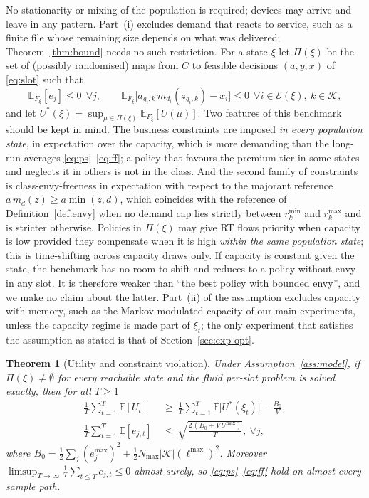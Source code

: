\documentclass[preprint,11pt]{elsarticle}
\newtheorem{theorem}{Theorem}
\theoremstyle{definition}
\theoremstyle{remark}
\newcommand{\rmin}{r^{\min}}
\newcommand{\rmax}{r^{\max}}
\newcommand{\E}{\mathbb{E}}
\newcommand{\cK}{\mathcal{K}}
\newcommand{\cE}{\mathcal{E}}
\begin{document}
No stationarity or mixing of the population is required; devices may arrive and leave in any pattern.
Part~(i) excludes demand that reacts to service, such as a finite file whose remaining size depends on what was delivered; Theorem~\ref{thm:bound} needs no such restriction.
For a state $\xi$ let $\Pi(\xi)$ be the set of (possibly randomised) maps from $C$ to feasible decisions $(a,y,x)$ of \eqref{eq:slot} such that
\begin{equation}\label{eq:bench}
\E_{F_\xi}[e_j]\le0\ \ \forall j,\qquad
\E_{F_\xi}\big[a_{g_i,k}\,m_{d_i}(z_{g_i,k})-x_i\big]\le0\ \ \forall i\in\cE(\xi),\ k\in\cK,
\end{equation}
and let $U^*(\xi)=\sup_{\mu\in\Pi(\xi)}\E_{F_\xi}[U(\mu)]$.
Two features of this benchmark should be kept in mind.
The business constraints are imposed \emph{in every population state}, in expectation over the capacity, which is more demanding than the long-run averages \eqref{eq:ps}--\eqref{eq:ff}; a policy that favours the premium tier in some states and neglects it in others is not in the class.
And the second family of constraints is class-envy-freeness in expectation with respect to the majorant reference $a\,m_d(z)\ge a\min(z,d)$, which coincides with the reference of Definition~\ref{def:envy} when no demand cap lies strictly between $\rmin_k$ and $\rmax_k$ and is stricter otherwise.
Policies in $\Pi(\xi)$ may give RT flows priority when capacity is low provided they compensate when it is high \emph{within the same population state}; this is time-shifting across capacity draws only. If capacity is constant given the state, the benchmark has no room to shift and reduces to a policy without envy in any slot. It is therefore weaker than ``the best policy with bounded envy'', and we make no claim about the latter.
Part~(ii) of the assumption excludes capacity with memory, such as the Markov-modulated capacity of our main experiments, unless the capacity regime is made part of $\xi_t$; the only experiment that satisfies the assumption as stated is that of Section~\ref{sec:exp-opt}.

\begin{theorem}[Utility and constraint violation]\label{thm:opt}
Under Assumption~\ref{ass:model}, if $\Pi(\xi)\neq\emptyset$ for every reachable state and the fluid per-slot problem is solved exactly, then for all $T\ge1$
\begin{align*}
\frac1T\sum_{t=1}^{T}\E[U_t]\ &\ge\ \frac1T\sum_{t=1}^{T}\E\big[U^*(\xi_t)\big]-\frac{B_0}{V},\\
\frac1T\sum_{t=1}^{T}\E[e_{j,t}]\ &\le\ \sqrt{\frac{2\,(B_0+V\,U^{\max})}{T}},\ \forall j,
\end{align*}
where $B_0=\tfrac12\sum_j(e_j^{\max})^2\allowbreak+\tfrac12N_{\max}|\cK|(\ell^{\max})^2$.
Moreover $\limsup_{T\to\infty}\frac1T\sum_{t\le T}e_{j,t}\le0$ almost surely, so \eqref{eq:ps}--\eqref{eq:ff} hold on almost every sample path.
\end{theorem}
\end{document}
